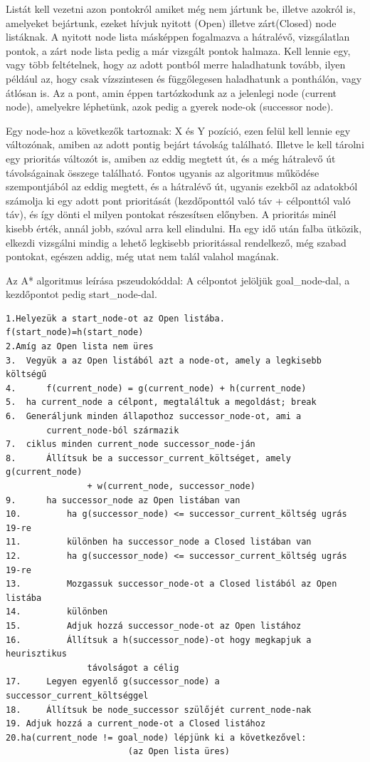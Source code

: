 Listát kell vezetni azon pontokról amiket még nem jártunk be, illetve azokról is, amelyeket bejártunk, ezeket hívjuk nyitott (Open) illetve zárt(Closed) node listáknak. A nyitott node lista másképpen fogalmazva a hátralévő, vizsgálatlan pontok, a zárt node lista pedig a már vizsgált pontok halmaza. Kell lennie egy, vagy több feltételnek, hogy az adott pontból merre haladhatunk tovább, ilyen például az, hogy csak vízszintesen és függőlegesen haladhatunk a ponthálón, vagy átlósan is.  Az a pont, amin éppen tartózkodunk az a jelenlegi node (current node), amelyekre léphetünk, azok pedig a gyerek node-ok (successor node).

Egy node-hoz a következők tartoznak: X és Y pozíció, ezen felül kell lennie egy változónak, amiben az adott pontig bejárt távolság található. Illetve le kell tárolni egy prioritás változót is, amiben az eddig megtett út, és a még hátralevő út távolságainak összege található.
Fontos ugyanis az algoritmus működése szempontjából az eddig megtett, és a hátralévő út, ugyanis ezekből az adatokból számolja ki egy adott pont prioritását (kezdőponttól való táv + célponttól való táv), és így dönti el milyen pontokat részesítsen előnyben. A prioritás minél kisebb érték, annál jobb, szóval arra kell elindulni. Ha egy idő után falba ütközik, elkezdi vizsgálni mindig a lehető legkisebb prioritással rendelkező, még szabad pontokat, egészen addig, még utat nem talál valahol magának.

Az A* algoritmus leírása pszeudokóddal:
A célpontot jelöljük goal\_node-dal, a kezdőpontot pedig start\_node-dal.

\begin{verbatim} 
1.Helyezük a start_node-ot az Open listába. f(start_node)=h(start_node)
2.Amíg az Open lista nem üres
3.	Vegyük a az Open listából azt a node-ot, amely a legkisebb költségű
4.		f(current_node) = g(current_node) + h(current_node)
5.	ha current_node a célpont, megtaláltuk a megoldást; break
6.	Generáljunk minden állapothoz successor_node-ot, ami a 
		current_node-ból származik
7.	ciklus minden current_node successor_node-ján
8.		Állítsuk be a successor_current_költséget, amely g(current_node) 
				+ w(current_node, successor_node)
9.		ha successor_node az Open listában van
10.			ha g(successor_node) <= successor_current_költség ugrás 19-re
11.			különben ha successor_node a Closed listában van
12.			ha g(successor_node) <= successor_current_költség ugrás 19-re
13.			Mozgassuk successor_node-ot a Closed listából az Open listába
14.		    különben
15.			Adjuk hozzá successor_node-ot az Open listához
16.			Állítsuk a h(successor_node)-ot hogy megkapjuk a heurisztikus 
				távolságot a célig
17.		Legyen egyenlő g(successor_node) a successor_current_költséggel
18.		Állítsuk be node_successor szülőjét current_node-nak
19.	Adjuk hozzá a current_node-ot a Closed listához
20.ha(current_node != goal_node) lépjünk ki a következővel: 
						(az Open lista üres)
\end{verbatim}


